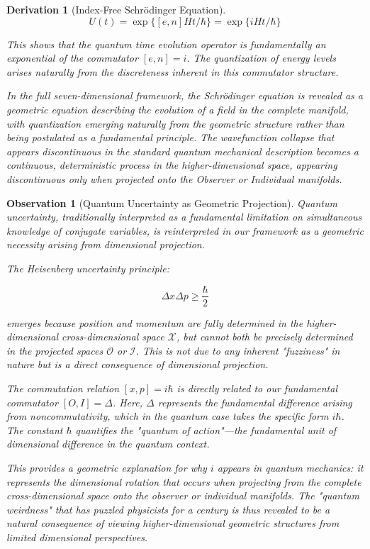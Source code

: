 \documentclass{article}
\newtheorem{observation}{Observation}
\newtheorem{derivation}{Derivation}
\begin{document}
\begin{derivation}[Index-Free Schrödinger Equation]
\begin{equation}
U(t) = \exp\{[e, n]Ht/\hbar\} = \exp\{iHt/\hbar\}
\end{equation}

This shows that the quantum time evolution operator is fundamentally an exponential of the commutator $[e, n] = i$. The quantization of energy levels arises naturally from the discreteness inherent in this commutator structure.

In the full seven-dimensional framework, the Schrödinger equation is revealed as a geometric equation describing the evolution of a field in the complete manifold, with quantization emerging naturally from the geometric structure rather than being postulated as a fundamental principle. The wavefunction collapse that appears discontinuous in the standard quantum mechanical description becomes a continuous, deterministic process in the higher-dimensional space, appearing discontinuous only when projected onto the Observer or Individual manifolds.
\end{derivation}

\begin{observation}[Quantum Uncertainty as Geometric Projection]
Quantum uncertainty, traditionally interpreted as a fundamental limitation on simultaneous knowledge of conjugate variables, is reinterpreted in our framework as a geometric necessity arising from dimensional projection.

The Heisenberg uncertainty principle:

\begin{equation}
\Delta x \Delta p \geq \frac{\hbar}{2}
\end{equation}

emerges because position and momentum are fully determined in the higher-dimensional cross-dimensional space $\mathcal{X}$, but cannot both be precisely determined in the projected spaces $\mathcal{O}$ or $\mathcal{I}$. This is not due to any inherent "fuzziness" in nature but is a direct consequence of dimensional projection.

The commutation relation $[x, p] = i\hbar$ is directly related to our fundamental commutator $[O, I] = \Delta$. Here, $\Delta$ represents the fundamental difference arising from noncommutativity, which in the quantum case takes the specific form $i\hbar$. The constant $\hbar$ quantifies the "quantum of action"—the fundamental unit of dimensional difference in the quantum context.

This provides a geometric explanation for why $i$ appears in quantum mechanics: it represents the dimensional rotation that occurs when projecting from the complete cross-dimensional space onto the observer or individual manifolds. The "quantum weirdness" that has puzzled physicists for a century is thus revealed to be a natural consequence of viewing higher-dimensional geometric structures from limited dimensional perspectives.
\end{observation}
\end{document}
